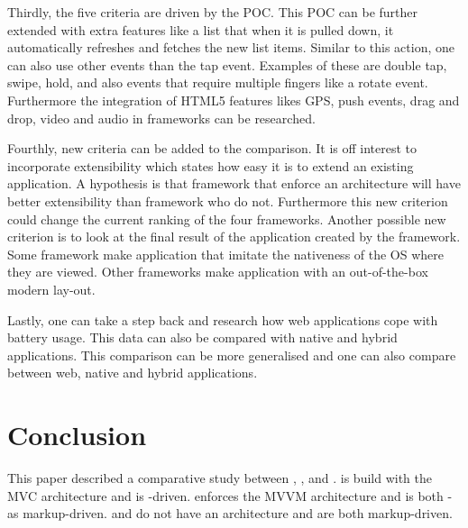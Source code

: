 \documentclass[a4paper]{artikel3}
\begin{document}
Thirdly, the five criteria are driven by the POC.
This POC can be further extended with extra features like a list that when it is pulled down, it automatically refreshes and fetches the new list items.
Similar to this action, one can also use other events than the tap event.
Examples of these are double tap, swipe, hold, and also events that require multiple fingers like a rotate event.
Furthermore the integration of HTML5 features likes GPS, push events, drag and drop, video and audio in frameworks can be researched.

Fourthly, new criteria can be added to the comparison.
It is off interest to incorporate extensibility which states how easy it is to extend an existing application.
A hypothesis is that framework that enforce an architecture will have better extensibility than framework who do not.
Furthermore this new criterion could change the current ranking of the four frameworks.
Another possible new criterion is to look at the final result of the application created by the framework.
Some framework make application that imitate the nativeness of the OS where they are viewed.
Other frameworks make application with an out-of-the-box modern lay-out.

Lastly, one can take a step back and research how web applications cope with battery usage.
This data can also be compared with native and hybrid applications.
This comparison can be more generalised and one can also compare between web, native and hybrid applications.


\section{Conclusion} %
\label{sec:conclusion}


This paper described a comparative study between \sta{},  \kendoa{},  \jqma{} and \lungo{}.
\sta{} is build with the MVC architecture and is \js-driven.
\kendoa{} enforces the MVVM architecture and is both \js- as markup-driven.
\jqma{} and \lungo{} do not have an architecture and are both markup-driven.
\end{document}

